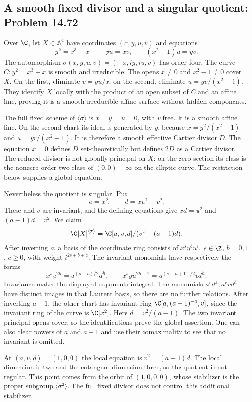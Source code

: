 \subsection{A smooth fixed divisor and a singular quotient: Problem 14.72}
\label{cand:14.72}

Over \(\C\), let \(X\subset\mathbb A^4\) have coordinates
\((x,y,u,v)\) and equations
\[
 y^2=x^3-x,\qquad yu=xv,\qquad (x^2-1)u=yv.
\]
The automorphism
\(\sigma(x,y,u,v)=(-x,iy,iu,v)\) has order four.
The curve \(C:y^2=x^3-x\) is smooth and irreducible.
The opens \(x\ne0\) and \(x^2-1\ne0\) cover \(X\).
On the first, eliminate \(v=yu/x\); on the second,
eliminate \(u=yv/(x^2-1)\). They identify \(X\)
locally with the product of an open subset of \(C\)
and an affine line, proving it is a smooth irreducible
affine surface without hidden components.

The full fixed scheme of \(\langle\sigma\rangle\) is
\(x=y=u=0\), with \(v\) free. It is a smooth affine
line. On the second chart its ideal is generated by
\(y\), because \(x=y^2/(x^2-1)\) and
\(u=yv/(x^2-1)\). It is therefore a smooth effective Cartier divisor \(D\).
The equation \(x=0\) defines \(D\) set-theoretically but defines
\(2D\) as a Cartier divisor. The reduced divisor is not globally
principal on \(X\): on the zero section its class is the nonzero
order-two class of \((0,0)-\infty\) on the elliptic curve.
The restriction below supplies a global equation.

Nevertheless the quotient is singular. Put
\[
 a=x^2,\qquad d=xu^2-v^2.
\]
These and \(v\) are invariant, and the defining equations
give \(xd=u^2\) and \((a-1)d=v^2\). We claim
\[
 \C[X]^{\langle\sigma\rangle}
       =\C[a,v,d]/(v^2-(a-1)d).
\]
After inverting \(a\), a basis of the coordinate ring
consists of \(x^s y^b u^c\), \(s\in\Z\), \(b=0,1\),
\(c\geq0\), with weight \(i^{2s+b+c}\).
The invariant monomials have respectively the forms
\[
 x^s u^{2h}=a^{(s+h)/2}d^h,\qquad
 x^s y u^{2h+1}=a^{(s+h+1)/2}vd^h.
\]
Invariance makes the displayed exponents integral.
The monomials \(a^r d^h,a^r v d^h\) have distinct
images in that Laurent basis, so there are no
further relations. After inverting \(a-1\), the other
chart has invariant ring
\(\C[a,(a-1)^{-1},v]\), since the invariant ring of
the curve is \(\C[x^2]\). Here \(d=v^2/(a-1)\).
The two invariant principal opens cover, so the
identifications prove the global assertion. One can
also clear powers of \(a\) and \(a-1\) and use their
comaximality to see that no invariant is omitted.

At \((a,v,d)=(1,0,0)\) the local equation is
\(v^2=(a-1)d\). The local dimension is two and the
cotangent dimension three, so the quotient is not
regular. This point comes from the orbit of
\((1,0,0,0)\), whose stabilizer is the proper subgroup
\(\langle\sigma^2\rangle\). The full fixed divisor
does not control this additional stabilizer.

